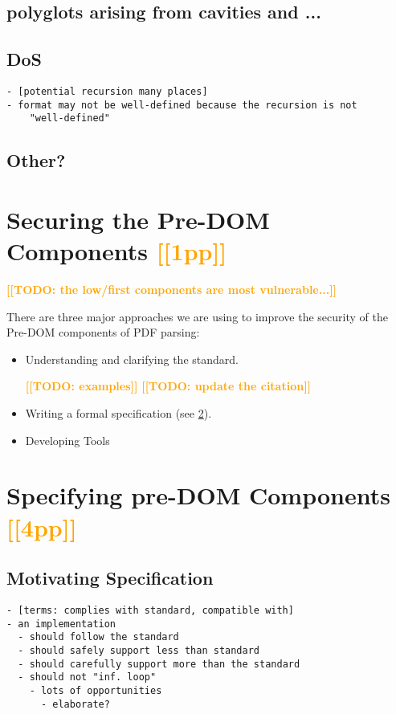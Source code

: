 \documentclass[conference,11pt]{IEEEtran}
\newcommand{\note}[1]{\noteYes{#1}}
\newcommand{\noteYes}[1]{\textbf{\textcolor{orange}{[[#1]]}}}
\newcommand{\todo}[1]{\note{TODO: #1}}
\begin{document}
\subsection{polyglots arising from cavities and ...}

\subsection{DoS}
\begin{lstlisting}
- [potential recursion many places]
- format may not be well-defined because the recursion is not
    "well-defined"
\end{lstlisting}

\subsection{Other?}

\section{Securing the Pre-DOM Components \note{1pp}}
\label{sec:securing}

\todo{the low/first components are most vulnerable...}
     
There are three major approaches we are using to improve the security of the
Pre-DOM components of PDF parsing:
\begin{itemize}
 \item Understanding and clarifying the standard.
  
   \todo{examples}
   \cite{pdfspec} \todo{update the citation}    
 \item Writing a formal specification (see \cref{sec:specifying}).

 \item Developing Tools
\end{itemize}

\section{Specifying pre-DOM Components \note{4pp}}
\label{sec:specifying}

\subsection{Motivating Specification}
\begin{lstlisting}
- [terms: complies with standard, compatible with]
- an implementation
  - should follow the standard
  - should safely support less than standard
  - should carefully support more than the standard
  - should not "inf. loop"
    - lots of opportunities
      - elaborate?
\end{lstlisting}
\end{document}
